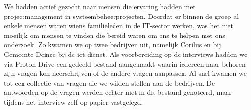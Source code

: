 \documentclass{article}
\begin{document}
    We hadden actief gezocht naar mensen die ervaring hadden met projectmanagement in systeembeheerprojecten.
    Doordat er binnen de groep al enkele mensen waren wiens familieleden in de IT-sector werken, was het niet moeilijk om mensen te vinden die bereid waren om ons te helpen met ons onderzoek.
    Zo kwamen we op twee bedrijven uit, namelijk Corilus en bij Gemeente Deinze bij de ict dienst. \newline
    Als voorbereiding op de interviews hadden we via Proton Drive een gedeeld bestand aangemaakt waarin iedereen naar behoren zijn vragen kon neerschrijven of de andere vragen aanpassen. 
    Al snel kwamen we tot een collectie van vragen die we wilden stellen aan de bedrijven.
    De antwoorden op de vragen werden echter niet in dit bestand genoteerd, maar tijdens het interview zelf op papier vastgelegd.
    \newpage
\end{document}
